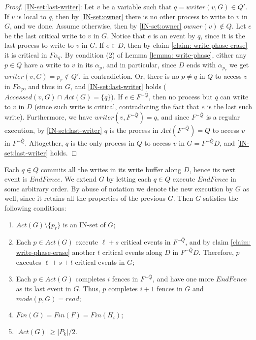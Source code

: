 \begin{proof}
	\ref{IN-set:last-writer}: Let $v$ be a variable such that $q = writer(v,G) \in Q'$. If $v$ is local to $q$, then by \ref{IN-set:owner} there is no other process to write to $v$ in $G$, and we done. Assume otherwise, then by \ref{IN-set:owner} $owner(v) \notin Q$. Let $e$ be the last critical write to $v$ in $G$. Notice that $e$ is an event by $q$, since it is the last process to write to $v$ in $G$.
	If $e \in D$, then by claim \ref{claim: write-phase-erase} it is critical in $F \alpha_q$. By condition (2) of Lemma \ref{lemma: write-phase}, either any $p \in Q$ have a write to $v$ in its $\alpha_p$, and in particular, since $D$ ends with $\alpha_{p_r}$ we get $writer(v,G) = p_r \notin Q'$, in contradiction. Or, there is no $p \neq q$ in $Q$ to access $v$ in $F \alpha_p$, and thus in $G$, and \ref{IN-set:last-writer} holds ($Accessed(v,G) \cap Act(G) =\{q\}$).
	If $e \in F^{-\overline{Q}}$, then no process but $q$ can write to $v$ in $D$ (since such write is critical, contradicting the fact that $e$ is the last such write). Furthermore, we have $writer(v,F^{-\overline{Q}}) = q$, and since $F^{-\overline{Q}}$ is a regular execution, by \ref{IN-set:last-writer} $q$ is the process in $Act(F^{-\overline{Q}}) = Q$ to access $v$ in $F^{-\overline{Q}}$. Altogether, $q$ is the only process in $Q$ to access $v$ in $G = F^{-\overline{Q}} D$, and \ref{IN-set:last-writer} holds.
\end{proof}

Each $q \in Q$ commits all the writes in its write buffer along $D$, hence its next event is $EndFence$. We extend $G$ by letting each $q \in Q$ execute $EndFence$ in some arbitrary order. By abuse of notation we denote the new execution by $G$ as well, since it retains all the properties of the previous $G$. Then $G$ satisfies the following conditions:
\begin{enumerate}[(1)]
	\item $Act(G) \setminus \{p_r\}$ is an IN-set of $G$;
	\item Each $p \in Act(G)$ execute $\ell+s$ critical events in $F^{-\overline{Q}}$, and by claim \ref{claim: write-phase-erase} another $t$ critical events along $D$ in $F^{-\overline{Q}} D$. Therefore, $p$ executes $\ell+s+t$ critical events in $G$;
	\item Each $p \in Act(G)$ completes $i$ fences in $F^{-\overline{Q}}$, and have one more $EndFence$ as its last event in $G$. Thus, $p$ completes $i+1$ fences in $G$ and $mode(p,G) = read$;
	\item $Fin(G) = Fin(F) = Fin(H_i)$;
	\item $|Act(G)| \geq |P_k|/2$.
\end{enumerate}

